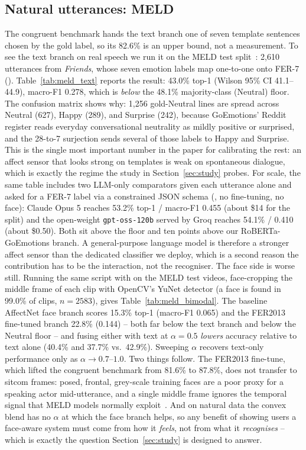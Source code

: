 \documentclass[sigconf,nonacm]{acmart}
\begin{document}
  \subsection{Natural utterances: MELD}\label{sec:meld}
  The congruent benchmark hands the text branch one of seven template sentences chosen by the gold label, so its 82.6\% is an upper bound, not a measurement. To see the text branch on real speech we run it on the MELD test split~\cite{poria2019meld}: 2,610 utterances from \emph{Friends}, whose seven emotion labels map one-to-one onto FER-7 (). Table~\ref{tab:meld_text} reports the result: 43.0\% top-1 (Wilson 95\% CI 41.1--44.9), macro-F1 0.278, which is \emph{below} the 48.1\% majority-class (Neutral) floor. The confusion matrix shows why: 1,256 gold-Neutral lines are spread across Neutral (627), Happy (289), and Surprise (242), because GoEmotions' Reddit register reads everyday conversational neutrality as mildly positive or surprised, and the 28-to-7 surjection sends several of those labels to Happy and Surprise. This is the single most important number in the paper for calibrating the rest: an affect sensor that looks strong on templates is weak on spontaneous dialogue, which is exactly the regime the study in Section~\ref{sec:study} probes. For scale, the same table includes two LLM-only comparators given each utterance alone and asked for a FER-7 label via a constrained JSON schema (, no fine-tuning, no face): Claude Opus 5 reaches 53.2\% top-1 / macro-F1 0.455 (about \$14 for the split) and the open-weight \texttt{gpt-oss-120b} served by Groq reaches 54.1\% / 0.410 (about \$0.50). Both sit above the floor and ten points above our RoBERTa-GoEmotions branch. A general-purpose language model is therefore a stronger affect sensor than the dedicated classifier we deploy, which is a second reason the contribution has to be the interaction, not the recogniser. The face side is worse still. Running the same script with  on the MELD test videos, face-cropping the middle frame of each clip with OpenCV's YuNet detector (a face is found in 99.0\% of clips, $n\!=\!2583$), gives Table~\ref{tab:meld_bimodal}. The baseline AffectNet face branch scores 15.3\% top-1 (macro-F1 0.065) and the FER2013 fine-tuned branch 22.8\% (0.144) -- both far below the text branch and below the Neutral floor -- and fusing either with text at $\alpha\!=\!0.5$ \emph{lowers} accuracy relative to text alone (40.4\% and 37.7\% vs.\ 42.9\%). Sweeping $\alpha$ recovers text-only performance only as $\alpha\!\to\!0.7$--$1.0$. Two things follow. The FER2013 fine-tune, which lifted the congruent benchmark from 81.6\% to 87.8\%, does not transfer to sitcom frames: posed, frontal, grey-scale training faces are a poor proxy for a speaking actor mid-utterance, and a single middle frame ignores the temporal signal that MELD models normally exploit~\cite{poria2019meld}. And on natural data the convex blend has no $\alpha$ at which the face branch helps, so any benefit of showing users a face-aware system must come from how it \emph{feels}, not from what it \emph{recognises} -- which is exactly the question Section~\ref{sec:study} is designed to answer.
\end{document}
